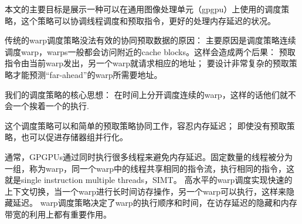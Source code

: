 本文的主要目标是展示一种可以在通用图像处理单元（gpgpu）上使用的调度策略，这个策略可以协调线程调度和预取指令，更好的处理内存延迟的状况。

传统的warp调度策略没法有效的协同预取数据的原因：
	主要原因是调度策略连续调度warp，warps一般都会访问附近的cache blocks。这样会造成两个后果：
		预取指令由当前warp发出，另一个warp就请求相应的地址；
		要设计非常复杂的预取策略才能预测“far-ahead”的warp所需要地址。

我们的调度策略的核心思想：
	在时间上分开调度连续的warp，这样的话他们就不会一个挨着一个的执行.

	这个调度策略可以和简单的预取策略协同工作，容忍内存延迟；
	即使没有预取策略，也可以促进存储器组并行化。


通常，GPGPUs通过同时执行很多线程来避免内存延迟。固定数量的线程被分为一组，称为warp，同一个warp中的线程共享相同的指令流，执行相同的指令，这就是single instruction multiple threads，SIMT。
高水平的warp调度实现快速的上下文切换，当一个warp进行长时间访存操作，另一个warp可以执行，这样来隐藏延迟。
warp调度策略决定了warp的执行顺序和时间，在访存延迟的隐藏和内存带宽的利用上都有重要作用。

	
